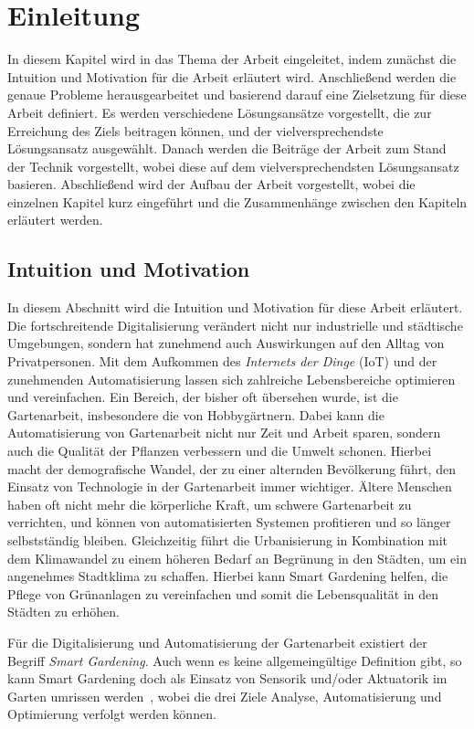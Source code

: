 \chapter{Einleitung}\label{ch:einleitung}
In diesem Kapitel wird in das Thema der Arbeit eingeleitet, indem zunächst die Intuition und Motivation für die Arbeit erläutert wird.
Anschließend werden die genaue Probleme herausgearbeitet und basierend darauf eine Zielsetzung für diese Arbeit definiert.
Es werden verschiedene Lösungsansätze vorgestellt, die zur Erreichung des Ziels beitragen können, und der vielversprechendste Lösungsansatz ausgewählt.
Danach werden die Beiträge der Arbeit zum Stand der Technik vorgestellt, wobei diese auf dem vielversprechendsten Lösungsansatz basieren.
Abschließend wird der Aufbau der Arbeit vorgestellt, wobei die einzelnen Kapitel kurz eingeführt und die Zusammenhänge zwischen den Kapiteln erläutert werden.



\section{Intuition und Motivation}
In diesem Abschnitt wird die Intuition und Motivation für diese Arbeit erläutert.
Die fortschreitende Digitalisierung verändert nicht nur industrielle und städtische Umgebungen, sondern hat zunehmend auch Auswirkungen auf den Alltag von Privatpersonen.
Mit dem Aufkommen des \emph{Internets der Dinge} (IoT) und der zunehmenden Automatisierung lassen sich zahlreiche Lebensbereiche optimieren und vereinfachen.
Ein Bereich, der bisher oft übersehen wurde, ist die Gartenarbeit, insbesondere die von Hobbygärtnern.
Dabei kann die Automatisierung von Gartenarbeit nicht nur Zeit und Arbeit sparen, sondern auch die Qualität der Pflanzen verbessern und die Umwelt schonen.
Hierbei macht der demografische Wandel, der zu einer alternden Bevölkerung führt, den Einsatz von Technologie in der Gartenarbeit immer wichtiger.
Ältere Menschen haben oft nicht mehr die körperliche Kraft, um schwere Gartenarbeit zu verrichten, und können von automatisierten Systemen profitieren und so länger selbstständig bleiben.
Gleichzeitig führt die Urbanisierung in Kombination mit dem Klimawandel zu einem höheren Bedarf an Begrünung in den Städten, um ein angenehmes Stadtklima zu schaffen.
Hierbei kann Smart Gardening helfen, die Pflege von Grünanlagen zu vereinfachen und somit die Lebensqualität in den Städten zu erhöhen.

Für die Digitalisierung und Automatisierung der Gartenarbeit existiert der Begriff \emph{Smart Gardening}.
Auch wenn es keine allgemeingültige Definition gibt, so kann Smart Gardening doch als Einsatz von Sensorik und/oder Aktuatorik im Garten umrissen werden~\cite{SmartGardeningAi}, wobei die drei Ziele Analyse, Automatisierung und Optimierung verfolgt werden können.

